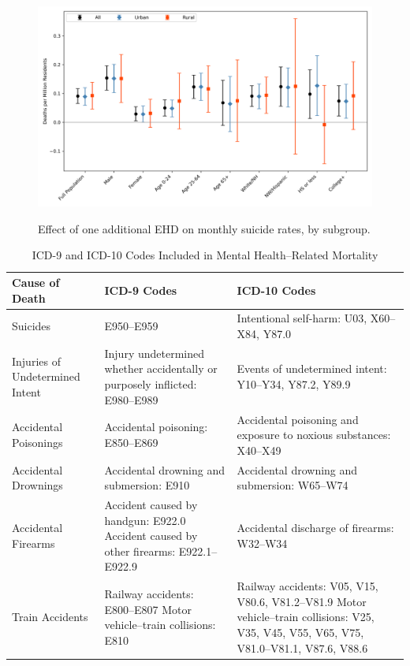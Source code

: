 \documentclass[12pt, a4paper]{article}
\begin{document}
\begin{figure}[ht]
    \centering
    \caption{Effect of one additional EHD on monthly suicide rates, by subgroup.}
    \includegraphics[width=\textwidth]{lin_results.png}
    \label{fig:lin_results}
\end{figure}

\begin{table}[H]
\centering
\caption{ICD-9 and ICD-10 Codes Included in Mental Health–Related Mortality} %
\label{tab:mentalhealth_icd} %
\begin{tabular}{|>{\raggedright\arraybackslash}p{3cm}|>{\raggedright\arraybackslash}p{5cm}|>{\raggedright\arraybackslash}p{5cm}|}
\hline
\textbf{Cause of Death} & \textbf{ICD-9 Codes} & \textbf{ICD-10 Codes} \\ \hline
Suicides & E950–E959 & Intentional self-harm: U03, X60–X84, Y87.0 \\ \hline
Injuries of Undetermined Intent & Injury undetermined whether accidentally or purposely inflicted: E980–E989 & Events of undetermined intent: Y10–Y34, Y87.2, Y89.9 \\ \hline
Accidental Poisonings & Accidental poisoning: E850–E869 & Accidental poisoning and exposure to noxious substances: X40–X49 \\ \hline
Accidental Drownings & Accidental drowning and submersion: E910 & Accidental drowning and submersion: W65–W74 \\ \hline
Accidental Firearms & Accident caused by handgun: E922.0 \newline Accident caused by other firearms: E922.1–E922.9 & Accidental discharge of firearms: W32–W34 \\ \hline
Train Accidents & Railway accidents: E800–E807 \newline Motor vehicle–train collisions: E810 & Railway accidents: V05, V15, V80.6, V81.2–V81.9 \newline Motor vehicle–train collisions: V25, V35, V45, V55, V65, V75, V81.0–V81.1, V87.6, V88.6 \\ \hline
\end{tabular}
\end{table}
\end{document}
